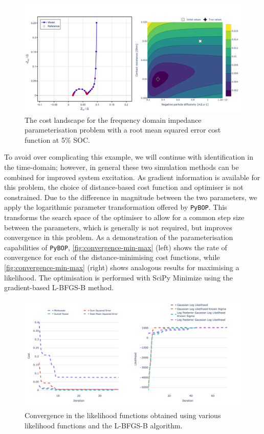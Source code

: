 \documentclass[
]{article}
\begin{document}
\begin{figure}
\centering
\includegraphics[width=1\textwidth,height=\textheight]{figures/joss/impedance.png}
\caption{The cost landscape for the frequency domain impedance
parameterisation problem with a root mean squared error cost function at
5\% SOC. \label{fig:impedance-landscape}}
\end{figure}

To avoid over complicating this example, we will continue with
identification in the time-domain; however, in general these two
simulation methods can be combined for improved system excitation. As
gradient information is available for this problem, the choice of
distance-based cost function and optimiser is not constrained. Due to
the difference in magnitude between the two parameters, we apply the
logarithmic parameter transformation offered by \texttt{PyBOP}. This
transforms the search space of the optimiser to allow for a common step
size between the parameters, which is generally is not required, but
improves convergence in this problem. As a demonstration of the
parameterisation capabilities of \texttt{PyBOP},
\autoref{fig:convergence-min-max} (left) shows the rate of convergence
for each of the distance-minimising cost functions, while
\autoref{fig:convergence-min-max} (right) shows analogous results for
maximising a likelihood. The optimisation is performed with SciPy
Minimize using the gradient-based L-BFGS-B method.

\begin{figure}
\centering
\includegraphics[width=1\textwidth,height=\textheight]{figures/joss/converge.png}
\caption{Convergence in the likelihood functions obtained using various
likelihood functions and the L-BFGS-B algorithm.
\label{fig:convergence-min-max}}
\end{figure}
\end{document}
